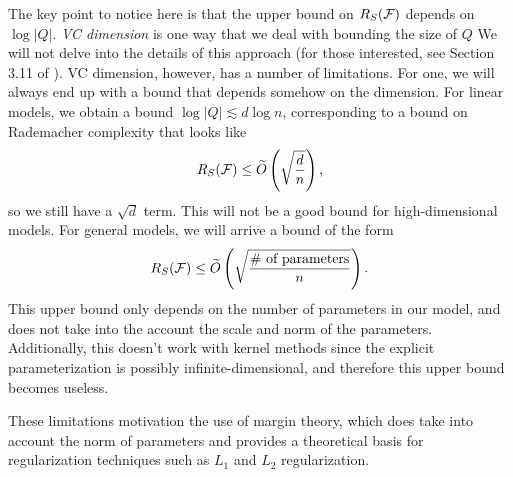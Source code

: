 The key point to notice here is that the upper bound on $R_S(\mathcal F)$ depends on $\log |Q|$. \textit{VC dimension} is one way that we deal with bounding the size of $Q$ We will not delve into the details of this approach (for those interested, see Section 3.11 of \cite{percynotes}). VC dimension, however, has a number of limitations. For one, we will always end up with a bound that depends somehow on the dimension. For linear models, we obtain a bound $\log |Q| \lesssim d \log n$, corresponding to a bound on Rademacher complexity that looks like
\begin{equation}
R_S(\mathcal F) \leq \widetilde{O} \left( \sqrt{\frac{d}{n}} \right),
\end{equation}
so we still have a $\sqrt{d}$ term. This will not be a good bound for high-dimensional models. For general models, we will arrive a bound of the form 
\begin{equation}
R_S(\mathcal F) \leq \widetilde{O} \left( \sqrt{\frac{\text{\# of parameters}}{n}} \right).
\end{equation}
This upper bound only depends on the number of parameters in our model, and does not take into the account the scale and norm of the parameters. Additionally, this doesn't work with kernel methods since the explicit parameterization is possibly infinite-dimensional, and therefore this upper bound becomes useless.

These limitations motivation the use of margin theory, which does take into account the norm of parameters and provides a theoretical basis for regularization techniques such as $L_1$ and $L_2$ regularization.